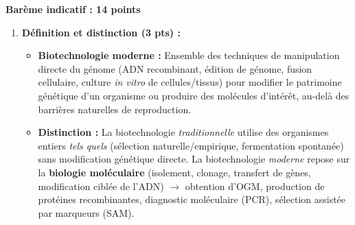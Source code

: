 \documentclass[11pt]{article}
\begin{document}
\begin{corrige}
\textbf{Barème indicatif : 14 points}

\begin{enumerate}
\item \textbf{Définition et distinction (3 pts) :}
\begin{itemize}
\item \textbf{Biotechnologie moderne :} Ensemble des techniques de manipulation directe du génome (ADN recombinant, édition de génome, fusion cellulaire, culture \emph{in vitro} de cellules/tissus) pour modifier le patrimoine génétique d'un organisme ou produire des molécules d'intérêt, au-delà des barrières naturelles de reproduction.
\item \textbf{Distinction :} La biotechnologie \emph{traditionnelle} utilise des organismes entiers \emph{tels quels} (sélection naturelle/empirique, fermentation spontanée) sans modification génétique directe. La biotechnologie \emph{moderne} repose sur la \textbf{biologie moléculaire} (isolement, clonage, transfert de gènes, modification ciblée de l'ADN) $\rightarrow$ obtention d'OGM, production de protéines recombinantes, diagnostic moléculaire (PCR), sélection assistée par marqueurs (SAM).
\end{itemize}


\end{enumerate}
\end{corrige}
\end{document}
